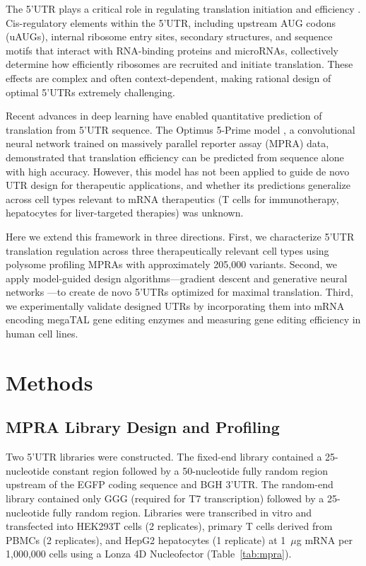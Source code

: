\documentclass[12pt]{article}
\begin{document}
The 5'UTR plays a critical role in regulating translation initiation and efficiency \citep{kozak1987analysis}. Cis-regulatory elements within the 5'UTR, including upstream AUG codons (uAUGs), internal ribosome entry sites, secondary structures, and sequence motifs that interact with RNA-binding proteins and microRNAs, collectively determine how efficiently ribosomes are recruited and initiate translation. These effects are complex and often context-dependent, making rational design of optimal 5'UTRs extremely challenging.

Recent advances in deep learning have enabled quantitative prediction of translation from 5'UTR sequence. The Optimus 5-Prime model \citep{sample2019human}, a convolutional neural network trained on massively parallel reporter assay (MPRA) data, demonstrated that translation efficiency can be predicted from sequence alone with high accuracy. However, this model has not been applied to guide de novo UTR design for therapeutic applications, and whether its predictions generalize across cell types relevant to mRNA therapeutics (T cells for immunotherapy, hepatocytes for liver-targeted therapies) was unknown.

Here we extend this framework in three directions. First, we characterize 5'UTR translation regulation across three therapeutically relevant cell types using polysome profiling MPRAs with approximately 205,000 variants. Second, we apply model-guided design algorithms---gradient descent and generative neural networks \citep{linder2020fast, lecun2015deep}---to create de novo 5'UTRs optimized for maximal translation. Third, we experimentally validate designed UTRs by incorporating them into mRNA encoding megaTAL gene editing enzymes \citep{certo2012tracking, weingartengasser2022megatal} and measuring gene editing efficiency in human cell lines.

\section{Methods}

\subsection{MPRA Library Design and Profiling}

Two 5'UTR libraries were constructed. The fixed-end library contained a 25-nucleotide constant region followed by a 50-nucleotide fully random region upstream of the EGFP coding sequence and BGH 3'UTR. The random-end library contained only GGG (required for T7 transcription) followed by a 25-nucleotide fully random region. Libraries were transcribed in vitro and transfected into HEK293T cells (2 replicates), primary T cells derived from PBMCs (2 replicates), and HepG2 hepatocytes (1 replicate) at 1~$\mu$g mRNA per 1,000,000 cells using a Lonza 4D Nucleofector (Table~\ref{tab:mpra}).
\end{document}
